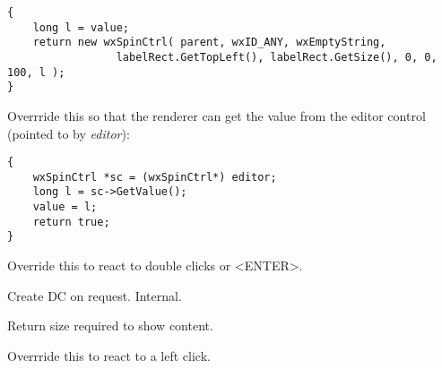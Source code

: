 {\small
\begin{verbatim}
{ 
    long l = value;
    return new wxSpinCtrl( parent, wxID_ANY, wxEmptyString, 
                 labelRect.GetTopLeft(), labelRect.GetSize(), 0, 0, 100, l );
}
\end{verbatim}
}

\label{wxdataviewcustomrenderergetvaluefromeditorctrl}


Overrride this so that the renderer can get the value 
from the editor control (pointed to by {\it editor}):

{\small
\begin{verbatim}
{ 
    wxSpinCtrl *sc = (wxSpinCtrl*) editor;
    long l = sc->GetValue();
    value = l;
    return true;
}
\end{verbatim}
}

\label{wxdataviewcustomrendereractivate}


Override this to react to double clicks or <ENTER>.

\label{wxdataviewcustomrenderergetdc}


Create DC on request. Internal.


\label{wxdataviewcustomrenderergetsize}


Return size required to show content.


\label{wxdataviewcustomrendererleftclick}


Overrride this to react to a left click.

\label{wxdataviewcustomrendererrender}


